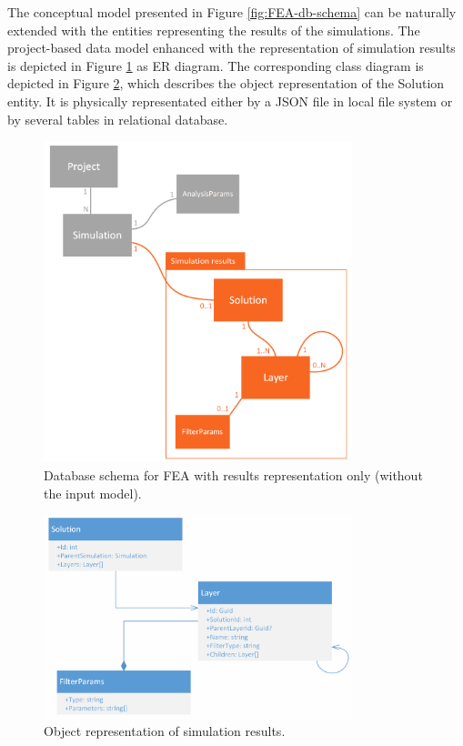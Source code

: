 
The conceptual model presented in Figure \ref{fig:FEA-db-schema} can be naturally extended with the entities representing the results of the simulations. The project-based data model enhanced with the representation of simulation results is depicted in Figure \ref{fig:FEA-db-schema-results} as ER diagram. The corresponding class diagram is depicted in Figure \ref{fig:results-class-diagram}, which describes the object representation of the Solution entity. It is physically representated either by a JSON file in local file system or by several tables in relational database.

\begin{figure}[H]
    \centering
    \includegraphics[width=0.8\textwidth]{figures/chapter-data-management/FEA-database-schema-only-results}
    \decoRule
    \caption[Database schema for FEA with results representation only]{Database schema for FEA with results representation only (without the input model).}
    \label{fig:FEA-db-schema-results}
\end{figure}

\begin{figure}[H]
    \centering
    \includegraphics[width=0.8\textwidth]{figures/chapter-data-management/results-class-diagram}
    \decoRule
    \caption{Object representation of simulation results.}
    \label{fig:results-class-diagram}
\end{figure}

